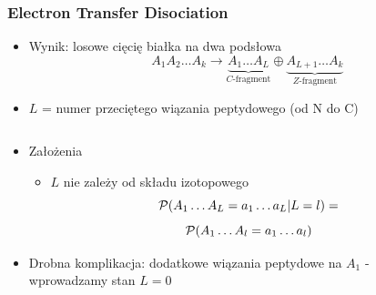 \documentclass[xetex]{beamer}
\begin{document}
	\begin{frame}\frametitle{Electron Transfer Disociation}
		\begin{itemize}
			\item Wynik: losowe cięcię białka na dwa podsłowa 
			$$ A_1 A_2 \dots A_k \rightarrow 
				\underbrace{A_1 \dots A_L}_\text{$C$-fragment}  \oplus \underbrace{A_{L+1} \dots A_k}_\text{$Z$-fragment}$$
			\item $L$ = numer przeciętego wiązania peptydowego (od N do C) 					
		\end{itemize}

		\begin{columns}
			\begin{column}[t]{.5\textwidth}
				\begin{itemize}
					\item Założenia
				\begin{itemize}
					\item $L$ nie zależy od składu izotopowego
					$$ \mathcal{P}( A_1 \dots A_L = a_1 \dots a_L | L=l ) = 
					$$
					$$ \mathcal{P}( A_1 \dots A_l = a_1 \dots a_l)$$
				\end{itemize}
					\item Drobna komplikacja: dodatkowe wiązania peptydowe na $A_1$ - wprowadzamy stan $L=0$ 
				\end{itemize}
			\end{column}
			\begin{column}[t]{.5\textwidth}
				\begin{center}

\end{center}
\end{column}
\end{columns}
\end{frame}
\end{document}
